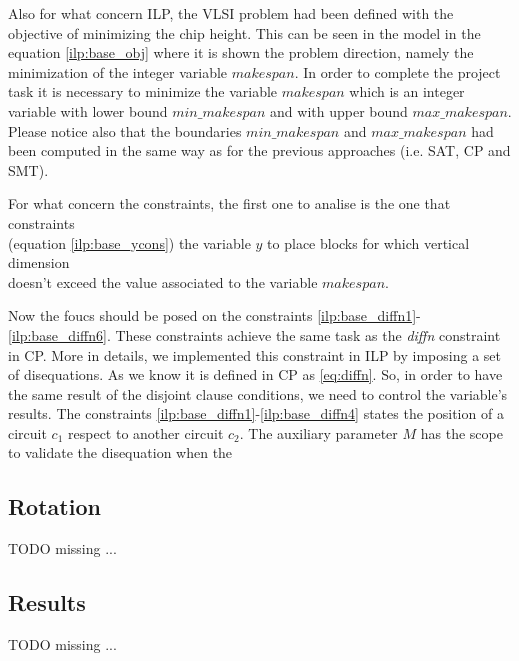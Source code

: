     Also for what concern ILP, the VLSI problem had been defined with the objective of minimizing 
    the chip height. This can be seen in the model in the equation \ref{ilp:base_obj} where it is
    shown the problem direction, namely the minimization of the integer variable $makespan$.
    In order to complete the project task it is necessary to minimize the variable $makespan$ which
    is an integer variable with lower bound $min\_makespan$ and with upper bound $max\_makespan$.
    Please notice also that the  boundaries $min\_makespan$ and $max\_makespan$ had been computed
    in the same way as for the previous approaches (i.e. SAT, CP and SMT).

    For what concern the constraints, the first one to analise is the one that constraints \\
    (equation \ref{ilp:base_ycons}) the variable $y$ to place blocks for which vertical dimension\\
    doesn't exceed the value associated to the variable $makespan$.

    Now the foucs should be posed on the constraints \ref{ilp:base_diffn1}-\ref{ilp:base_diffn6}.
    These constraints achieve the same task as the \textit{diffn} constraint in CP. More in
    details, we implemented this constraint in ILP by imposing a set of disequations. As we know
    it is defined in CP as \ref{eq:diffn}. So, in order to have the same result of the disjoint
    clause conditions, we need to control the variable's results. The constraints 
    \ref{ilp:base_diffn1}-\ref{ilp:base_diffn4} states the position of a circuit $c_1$ respect to
    another circuit $c_2$. The auxiliary parameter $M$ has the scope to validate the disequation
    when the  
    
    


\subsection{Rotation}
    \colorbox{BurntOrange}{TODO missing ...}




\subsection{Results}
    \colorbox{BurntOrange}{TODO missing ...}
